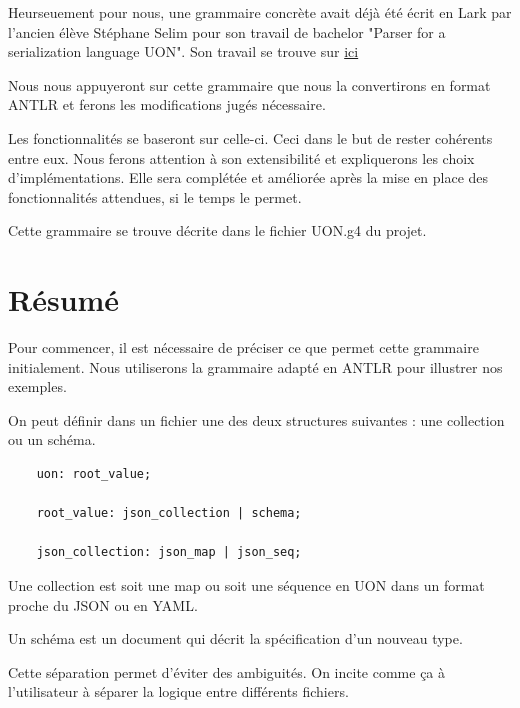 \documentclass[
    iict, %
    il, %
]{heig-tb}
\begin{document}
Heurseuement pour nous, une grammaire concrète avait déjà été écrit en Lark par l'ancien élève Stéphane Selim pour son travail de bachelor "Parser for a serialization language UON".
Son travail se trouve sur \href{https://github.com/uon-language/uon-parser}{ici}

Nous nous appuyeront sur cette grammaire que nous la convertirons en format ANTLR et ferons les modifications jugés nécessaire.

Les fonctionnalités se baseront sur celle-ci. Ceci dans le but de rester cohérents entre eux.
Nous ferons attention à son extensibilité et expliquerons les choix d'implémentations.
Elle sera complétée et améliorée après la mise en place des fonctionnalités attendues, si le temps le permet.

Cette grammaire se trouve décrite dans le fichier UON.g4 du projet.

\section{Résumé}
Pour commencer, il est nécessaire de préciser ce que permet cette grammaire initialement.
Nous utiliserons la grammaire adapté en ANTLR pour illustrer nos exemples.

On peut définir dans un fichier une des deux structures suivantes : une collection ou un schéma.

\begin{lstlisting}
    uon: root_value;

    root_value: json_collection | schema;

    json_collection: json_map | json_seq;
\end{lstlisting}

Une collection est soit une map ou soit une séquence en UON dans un format proche du JSON ou en YAML.




Un schéma est un document qui décrit la spécification d'un nouveau type.



Cette séparation permet d'éviter des ambiguités. On incite comme ça à l'utilisateur à séparer la logique entre différents fichiers.
\end{document}
